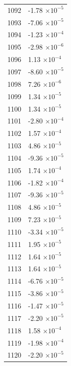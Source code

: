 \documentclass[a4paper,11pt]{article}
\begin{document}
\begin{center}
\begin{longtable}{|R{1.5cm}|R{2.5cm}|}
 1092 &        -1.78 $\times 10^{          -5}$ \\
 1093 &        -7.06 $\times 10^{          -5}$ \\
 1094 &        -1.23 $\times 10^{          -4}$ \\
 1095 &        -2.98 $\times 10^{          -6}$ \\
 1096 &         1.13 $\times 10^{          -4}$ \\
 1097 &        -8.60 $\times 10^{          -5}$ \\
 1098 &         7.26 $\times 10^{          -6}$ \\
 1099 &         1.34 $\times 10^{          -5}$ \\
 1100 &         1.34 $\times 10^{          -5}$ \\
 1101 &        -2.80 $\times 10^{          -4}$ \\
 1102 &         1.57 $\times 10^{          -4}$ \\
 1103 &         4.86 $\times 10^{          -5}$ \\
 1104 &        -9.36 $\times 10^{          -5}$ \\
 1105 &         1.74 $\times 10^{          -4}$ \\
 1106 &        -1.82 $\times 10^{          -4}$ \\
 1107 &        -9.36 $\times 10^{          -5}$ \\
 1108 &         4.86 $\times 10^{          -5}$ \\
 1109 &         7.23 $\times 10^{          -5}$ \\
 1110 &        -3.34 $\times 10^{          -5}$ \\
 1111 &         1.95 $\times 10^{          -5}$ \\
 1112 &         1.64 $\times 10^{          -5}$ \\
 1113 &         1.64 $\times 10^{          -5}$ \\
 1114 &        -6.76 $\times 10^{          -5}$ \\
 1115 &        -3.86 $\times 10^{          -5}$ \\
 1116 &        -1.47 $\times 10^{          -5}$ \\
 1117 &        -2.20 $\times 10^{          -5}$ \\
 1118 &         1.58 $\times 10^{          -4}$ \\
 1119 &        -1.98 $\times 10^{          -4}$ \\
 1120 &        -2.20 $\times 10^{          -5}$ \\

\end{longtable}
\end{center}
\end{document}

